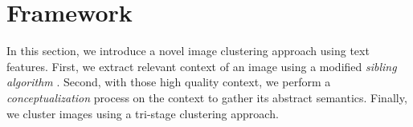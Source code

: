 \section{Framework}
In this section, we introduce a novel image clustering approach
using text features. 
First, we extract relevant context of an image
using a modified {\em sibling algorithm} \cite{Alcic2010}. Second, with those 
high quality context, we perform a \emph{conceptualization} 
process on the context to gather its abstract semantics. 
Finally, we cluster images using a tri-stage clustering approach.






